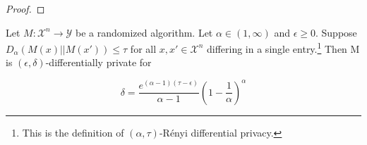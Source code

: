 \begin{lemma}
\begin{proof}





\end{proof}

\end{lemma}

\begin{theorem}
\label{renyidp-approxdp-delta}
\cite{CKS20} Let $M: \mathcal{X}^n \rightarrow \mathcal{Y}$ be a randomized algorithm. Let $\alpha \in (1, \infty)$ and $\epsilon \geq 0$. Suppose $D_\alpha(M(x) || M(x')) \leq \tau$ for all $x, x' \in \mathcal{X}^n$ differing in a single entry.\footnote{This is the definition of $(\alpha, \tau)$-R\'enyi differential privacy.} Then M is $(\epsilon, \delta)$-differentially private for 

\begin{equation}
    \delta = \frac{e^{(\alpha - 1) (\tau - \epsilon)}}{\alpha - 1} \left(1 - \frac{1}{\alpha}\right)^\alpha
\end{equation}
\end{theorem}

